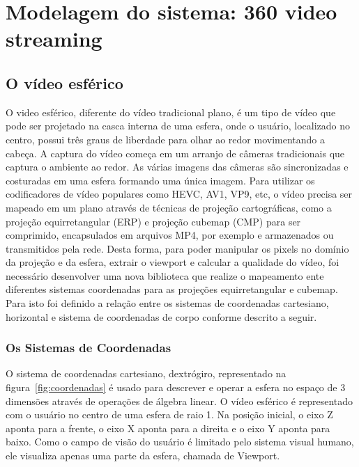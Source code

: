 \chapter{Modelagem do sistema: 360 video streaming}\label{Cap:Problem Design}
\section{O vídeo esférico}

O video esférico, diferente do vídeo tradicional plano, é um tipo de vídeo que pode ser projetado na casca interna de uma esfera, onde o usuário, localizado no centro, possui três graus de liberdade para olhar ao redor movimentando a cabeça. A captura do vídeo começa em um arranjo de câmeras tradicionais que captura o ambiente ao redor. As várias imagens das câmeras são sincronizadas e costuradas em uma esfera formando uma única imagem. Para utilizar os codificadores de vídeo populares como HEVC, AV1, VP9, etc, o vídeo precisa ser mapeado em um plano através de técnicas de projeção cartográficas, como a projeção equirretangular (ERP) e projeção cubemap (CMP) para ser comprimido, encapsulados em arquivos MP4, por exemplo e armazenados ou transmitidos pela rede. Desta forma, para poder manipular os pixels no domínio da projeção e da esfera, extrair o viewport e calcular a qualidade do vídeo, foi necessário desenvolver uma nova biblioteca que realize o mapeamento ente diferentes sistemas coordenadas para as projeções equirretangular e cubemap. Para isto foi definido a relação entre os sistemas de coordenadas cartesiano, horizontal e sistema de coordenadas de corpo conforme descrito a seguir.

\subsection{Os Sistemas de Coordenadas}

O sistema de coordenadas cartesiano, dextrógiro, representado na figura~\ref{fig:coordenadas} é usado para descrever e operar a esfera no espaço de 3 dimensões através de operações de álgebra linear. O vídeo esférico é representado com o usuário no centro de uma esfera de raio 1. Na posição inicial, o eixo Z aponta para a frente, o eixo X aponta para a direita e o eixo Y aponta para baixo. Como o campo de visão do usuário é limitado pelo sistema visual humano, ele visualiza apenas uma parte da esfera, chamada de Viewport.

